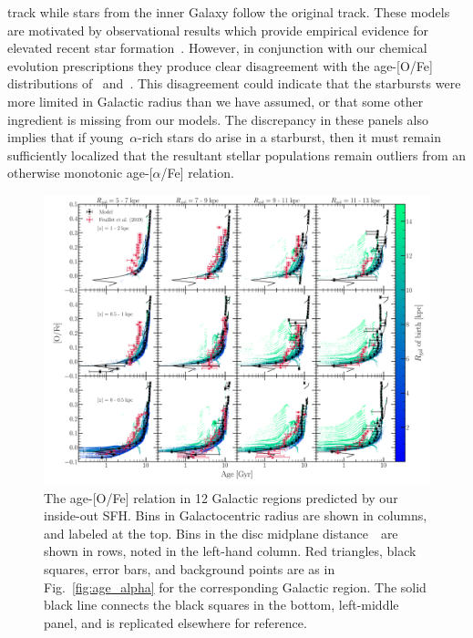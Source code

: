 \documentclass[draft2.tex]{subfiles}
\begin{document}
track while stars from the inner Galaxy follow the original track. 
These models are motivated by observational results which provide empirical 
evidence for elevated recent star formation~\citep{Mor2019, Isern2019}. 
However, in conjunction with our chemical evolution prescriptions they produce 
clear disagreement with the age-[O/Fe] distributions of~\citet{Feuillet2019} 
and~\citet{Miglio2021}. 
This disagreement could indicate that the starbursts were more limited in 
Galactic radius than we have assumed, or that some other ingredient is missing 
from our models. 
The discrepancy in these panels also implies that if young~$\alpha$-rich stars 
do arise in a starburst, then it must remain sufficiently localized that the 
resultant stellar populations remain outliers from an otherwise monotonic 
age-[$\alpha$/Fe] relation. 

\begin{figure} 
\centering 
\includegraphics[scale = 0.32]{age_alpha_regions.pdf} 
\caption{The age-[O/Fe] relation in 12 Galactic regions predicted by our 
inside-out SFH. Bins in Galactocentric radius are shown in columns, and labeled 
at the top. 
Bins in the disc midplane distance~\absz~are shown in rows, noted in the 
left-hand column. Red triangles, black squares, 
error bars, and background points are as in Fig.~\ref{fig:age_alpha} for the 
corresponding Galactic region. The solid black line connects the black squares 
in the bottom, left-middle panel, and is replicated elsewhere for reference. } 
\label{fig:age_alpha_regions} 
\end{figure} 
\end{document}
